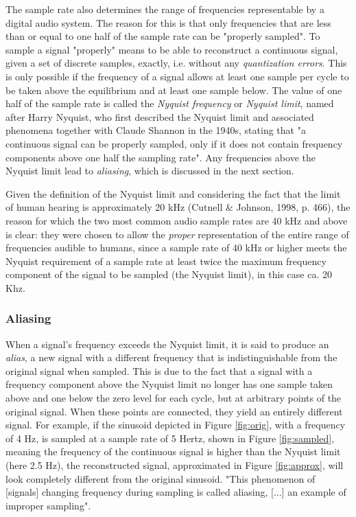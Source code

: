 The sample rate also determines the range of frequencies representable by a digital audio system. The reason for this is that only frequencies that are less than or equal to one half of the sample rate can be "properly sampled". To sample a signal "properly" means to be able to reconstruct a continuous signal, given a set of discrete samples, exactly, i.e. without any \emph{quantization errors}. This is only possible if the frequency of a signal allows at least one sample per cycle to be taken above the equilibrium and at least one sample below. The value of one half of the sample rate is called the \emph{Nyquist frequency} or \emph{Nyquist limit}, named after Harry Nyquist, who first described the Nyquist limit and associated phenomena together with Claude Shannon in the 1940s, stating that "a continuous signal can be properly sampled, only if it does not contain frequency components above one half the sampling rate". Any frequencies above the Nyquist limit lead to \emph{aliasing}, which is discussed in the next section.  \parbreak

Given the definition of the Nyquist limit and considering the fact that the limit of human hearing is approximately 20 kHz (Cutnell \& Johnson, 1998, p. 466), the reason for which the two most common audio sample rates are 40 kHz and above is clear: they were chosen to allow the \emph{proper} representation of the entire range of frequencies audible to humans, since a sample rate of 40 kHz or higher meets the Nyquist requirement of a sample rate at least twice the maximum frequency component of the signal to be sampled (the Nyquist limit), in this case ca. 20 Khz.

\subsubsection{Aliasing}

When a signal's frequency exceeds the Nyquist limit, it is said to produce an \emph{alias}, a new signal with a different frequency that is indistinguishable from the original signal when sampled. This is due to the fact that a signal with a frequency component above the Nyquist limit no longer has one sample taken above and one below the zero level for each cycle, but at arbitrary points of the original signal. When these points are connected, they yield an entirely different signal. For example, if the sinusoid depicted in Figure \ref{fig:orig}, with a frequency of 4 Hz, is sampled at a sample rate of 5 Hertz, shown in Figure \ref{fig:sampled}, meaning the frequency of the continuous signal is higher than the Nyquist limit (here 2.5 Hz), the reconstructed signal, approximated in Figure \ref{fig:approx}, will look completely different from the original sinusoid. "This phenomenon of [signals] changing frequency during sampling is called aliasing, [...] an example of improper sampling". 

